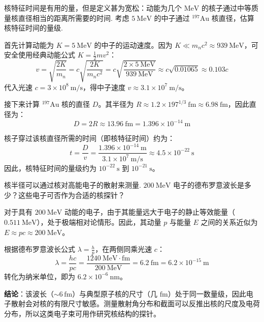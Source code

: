 \begin{exercise}\label{ex:29.10}
核特征时间是有用的量，但是定义甚为宽松：动能为几个 $\mathrm{MeV}$ 的核子通过中等质量核直径相当的距离所需要的时间. 考虑 $5 \ \mathrm{MeV}$ 的中子通过 $^{197}\mathrm{Au}$ 核直径，估算核特征时间的量级.
\end{exercise}
\begin{solution}
首先计算动能为 $K = 5 \ \mathrm{MeV}$ 的中子的运动速度。因为 $K \ll m_n c^2 \approx 939 \ \mathrm{MeV}$，可安全使用经典动能公式 $K = \frac{1}{2}m v^2$：
$$ v = \sqrt{\frac{2K}{m_n}} = c \sqrt{\frac{2K}{m_n c^2}} = c \sqrt{\frac{2 \times 5 \ \mathrm{MeV}}{939 \ \mathrm{MeV}}} \approx c \sqrt{0.01065} \approx 0.103 c $$
代入光速 $c = 3 \times 10^8 \ \mathrm{m/s}$，得中子速度 $v \approx 3.1 \times 10^7 \ \mathrm{m/s}$。

接下来计算 $^{197}\mathrm{Au}$ 核的直径 $D$。其半径为 $R \approx 1.2 \times 197^{1/3} \ \mathrm{fm} \approx 6.98 \ \mathrm{fm}$，因此直径为：
$$ D = 2R \approx 13.96 \ \mathrm{fm} = 1.396 \times 10^{-14} \ \mathrm{m} $$

核子穿过该核直径所需的时间（即核特征时间）约为：
$$ t = \frac{D}{v} = \frac{1.396 \times 10^{-14} \ \mathrm{m}}{3.1 \times 10^7 \ \mathrm{m/s}} \approx 4.5 \times 10^{-22} \ \mathrm{s} $$
因此，核特征时间的量级约为 $10^{-22} \ \mathrm{s}$ 到 $10^{-21} \ \mathrm{s}$。
\end{solution}

\begin{exercise}\label{ex:29.11}
核半径可以通过核对高能电子的散射来测量. $200 \ \mathrm{MeV}$ 电子的德布罗意波长是多少？这些电子可否作为合适的核探针？
\end{exercise}
\begin{solution}
对于具有 $200 \ \mathrm{MeV}$ 动能的电子，由于其能量远大于电子的静止等效能量（$0.511 \ \mathrm{MeV}$），处于极端相对论情形。因此，其动量 $p$ 与能量 $E$ 之间的关系近似为 $E \approx pc \approx 200 \ \mathrm{MeV}$。

根据德布罗意波长公式 $\lambda = \frac{h}{p}$，在两侧同乘光速 $c$：
$$ \lambda = \frac{hc}{pc} = \frac{1240 \ \mathrm{MeV \cdot fm}}{200 \ \mathrm{MeV}} = 6.2 \ \mathrm{fm} = 6.2 \times 10^{-15} \ \mathrm{m} $$
转化为纳米单位，即为 $6.2 \times 10^{-6} \ \mathrm{nm}$。

\textbf{结论}：该波长（$\sim6\,\mathrm{fm}$）与典型原子核的尺寸（几 $\mathrm{fm}$）处于同一数量级，因此电子散射会对核的有限尺寸敏感。测量散射角分布和截面可以反推出核的尺度及电荷分布，所以这类电子束可用作研究核结构的探针。
\end{solution}


